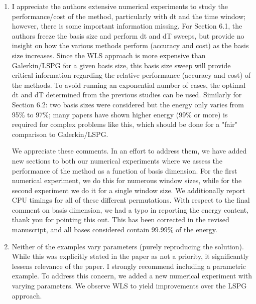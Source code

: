 \documentclass[3p,computermodern,10pt]{elsarticle}
\begin{document}
\begin{enumerate}
\item I appreciate the authors extensive numerical experiments to study the performance/cost of the method, particularly with dt and the time window; however, there is some important information missing. For Section 6.1, the authors freeze the basis size and perform dt and dT sweeps, but provide no insight on how the various methods perform (accuracy and cost) as the basis size increases. Since the WLS approach is more expensive than Galerkin/LSPG for a given basis size, this basis size sweep will provide critical information regarding the relative performance (accuracy and cost) of the methods. To avoid running an exponential number of cases, the optimal dt and dT determined from the previous studies can be used. Similarly for Section 6.2: two basis sizes were considered but the energy only varies from 95\% to 97\%; many papers have shown higher energy (99\% or more) is required for complex problems like this, which should be done for a "fair" comparison to Galerkin/LSPG.

{\color{red} We appreciate these comments. In an effort to address them, we have added new sections to both our numerical experiments where we assess the performance of the method as a function of basis dimension. For the first numerical experiment, we do this for numerous window sizes, while for the second experiment we do it for a single window size. We additionally report CPU timings for all of these different permutations. With respect to the final comment on basis dimension, we had a typo in reporting the energy content, thank you for pointing this out. This has been corrected in the revised manuscript, and all bases considered contain $99.99\%$ of the energy.}
 
\item Neither of the examples vary parameters (purely reproducing the solution). While this was explicitly stated in the paper as not a priority, it significantly lessens relevance of the paper. I strongly recommend including a parametric example.
{\color{red} To address this concern, we added a new numerical experiment with varying parameters. We observe WLS to yield improvements over the LSPG approach.}  

\end{enumerate}


\end{document}
